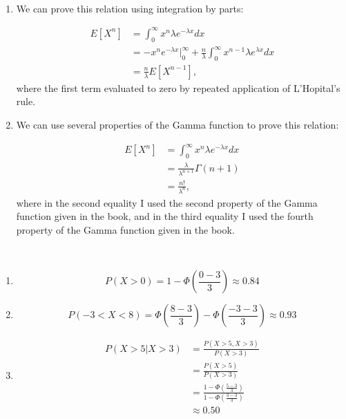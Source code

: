 \begin{problem}{7} $ $

\begin{enumerate}
\item  We can prove this relation using integration by parts:

\begin{align*}
E[X^n] &= \int_0^\infty x^n \lambda e^{-\lambda x}dx \\
& = -x^n e^{-\lambda x}\Big|_0^\infty +\frac{n}{\lambda}\int_0^\infty x^{n-1} \lambda e^{\lambda x}dx \\
 & = \frac{n}{\lambda}E[X^{n-1}],
\end{align*}
where the first term evaluated to zero by repeated application of L'Hopital's rule.

\item We can use several properties of the Gamma function to prove this relation:

\begin{align*}
E[X^n] &= \int_0^\infty x^n \lambda e^{-\lambda x}dx \\
&=\frac{\lambda}{\lambda^{n+1}}\Gamma(n+1) \\
& = \frac{n!}{\lambda^n},
\end{align*}
where in the second equality I used the second property of the Gamma function given in the book, and in the third equality I used the fourth property of the Gamma function given in the book.

\end{enumerate}

\end{problem}

\begin{problem}{8} $ $

\begin{enumerate}
\item

\begin{equation*}
P(X>0) = 1- \Phi \left(\frac{0-3}{3} \right) \approx 0.84
\end{equation*}

\item

\begin{equation*}
P(-3<X<8) = \Phi \left(\frac{8-3}{3} \right)- \Phi \left(\frac{-3-3}{3} \right) \approx 0.93
\end{equation*}

\item

\begin{align*}
P(X>5|X>3) &=\frac{P(X>5, X>3)}{P(X>3)} \\
& = \frac{P(X>5)}{P(X>3)} \\
& = \frac{1-\Phi \left(\frac{5-3}{3} \right)}{1-\Phi \left(\frac{3-3}{3} \right)} \\
& \approx 0.50
\end{align*}


\end{enumerate}

\end{problem}

